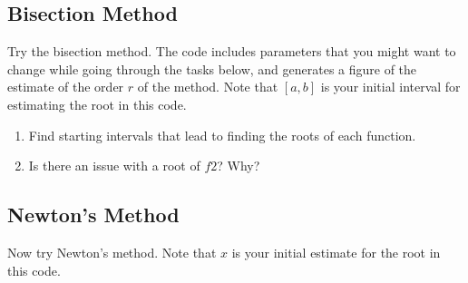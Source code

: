 \documentclass[12pt,letterpaper,noanswers]{exam}
\begin{document}
\subsection*{Bisection Method}

\noindent
Try the bisection method. The code includes parameters that you might want to change while going through the tasks below, and generates a figure of the estimate of the order $r$ of the method.  Note that $[a,b]$ is your initial interval for estimating the root in this code. 

\begin{enumerate}[resume=classQ]
\item Find starting intervals that lead to finding the roots of each function.

\vfill

\item Is there an issue with a root of $f2$? Why?

\vfill



\end{enumerate}










\subsection*{Newton's Method}

\noindent
Now try Newton's method.  Note that $x$ is your initial estimate for the root in this code.
\end{document}
